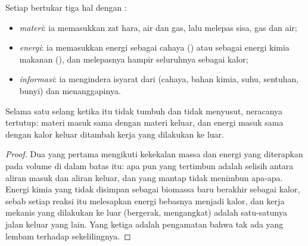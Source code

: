 \begin{proposition}\label{prop:b1:organism-environment:exchanges}
Setiap  bertukar tiga hal dengan :
\begin{itemize}
  \item \emph{materi}: ia memasukkan zat hara,
        air dan gas, lalu melepas sisa, gas dan air;
  \item \emph{energi}: ia memasukkan energi
        sebagai cahaya () atau sebagai energi kimia makanan
        (), dan melepasnya hampir seluruhnya sebagai kalor;
  \item \emph{informasi}: ia mengindera
        isyarat dari  (cahaya, bahan kimia, suhu, sentuhan,
        bunyi) dan menanggapinya.
\end{itemize}
Selama satu selang ketika  itu tidak tumbuh dan tidak menyusut,
neracanya tertutup: materi masuk sama dengan materi keluar, dan energi
masuk sama dengan kalor keluar ditambah kerja yang dilakukan ke luar.
\end{proposition}
\begin{proof}
Dua yang pertama mengikuti kekekalan massa dan energi yang diterapkan
pada volume di dalam batas itu: apa pun yang tertimbun adalah selisih
antara aliran masuk dan aliran keluar, dan  yang mantap tidak
menimbun apa-apa. Energi kimia yang tidak disimpan sebagai biomassa baru
berakhir sebagai kalor, sebab setiap reaksi  itu melesapkan
energi bebasnya menjadi kalor, dan kerja mekanis yang dilakukan ke luar
(bergerak, mengangkat) adalah satu-satunya jalan keluar yang lain. Yang
ketiga adalah pengamatan bahwa tak ada  yang lembam terhadap
sekelilingnya.
\end{proof}

